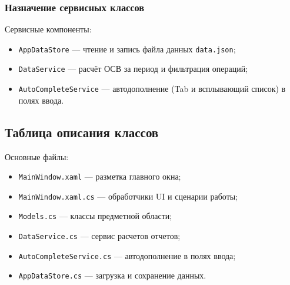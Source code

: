 \documentclass[14pt,a4paper]{extarticle}
\begin{document}
\subsubsection{Назначение сервисных классов}
Сервисные компоненты:
\begin{itemize}
    \item \texttt{AppDataStore} --- чтение и запись файла данных \texttt{data.json};
    \item \texttt{DataService} --- расчёт ОСВ за период и фильтрация операций;
    \item \texttt{AutoCompleteService} --- автодополнение (Tab и всплывающий список) в полях ввода.
\end{itemize}

\subsection{Таблица описания классов}
Основные файлы:
\begin{itemize}
    \item \texttt{MainWindow.xaml} --- разметка главного окна;
    \item \texttt{MainWindow.xaml.cs} --- обработчики UI и сценарии работы;
    \item \texttt{Models.cs} --- классы предметной области;
    \item \texttt{DataService.cs} --- сервис расчетов отчетов;
    \item \texttt{AutoCompleteService.cs} --- автодополнение в полях ввода;
    \item \texttt{AppDataStore.cs} --- загрузка и сохранение данных.
\end{itemize}
\end{document}
